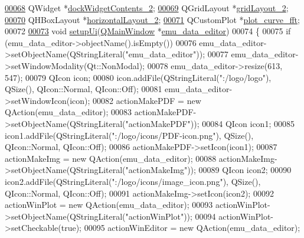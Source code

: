\begin{DoxyCode}
\hypertarget{a00051_source_l00068}{}\hyperlink{a00026_ae304b249d83cb3152fbbf7a7d7e0e29b}{00068}     QWidget *\hyperlink{a00026_ae304b249d83cb3152fbbf7a7d7e0e29b}{dockWidgetContents\_2};
\hypertarget{a00051_source_l00069}{}\hyperlink{a00026_ab6610272c6c39cba66cab113d98dcdcd}{00069}     QGridLayout *\hyperlink{a00026_ab6610272c6c39cba66cab113d98dcdcd}{gridLayout\_2};
\hypertarget{a00051_source_l00070}{}\hyperlink{a00026_aaee23fa38e3335cc652ebd35fcdbafc8}{00070}     QHBoxLayout *\hyperlink{a00026_aaee23fa38e3335cc652ebd35fcdbafc8}{horizontalLayout\_2};
\hypertarget{a00051_source_l00071}{}\hyperlink{a00026_a2bdf46ca3b702151408e6f6bd96b3228}{00071}     QCustomPlot *\hyperlink{a00026_a2bdf46ca3b702151408e6f6bd96b3228}{plot\_curve\_fft};
00072 
\hypertarget{a00051_source_l00073}{}\hyperlink{a00026_a33af8ac054888d9cc0833b699028b690}{00073}     \textcolor{keywordtype}{void} \hyperlink{a00026_a33af8ac054888d9cc0833b699028b690}{setupUi}(\hyperlink{a00010}{QMainWindow} *\hyperlink{a00004}{emu\_data\_editor})
00074     \{
00075         \textcolor{keywordflow}{if} (emu\_data\_editor->objectName().isEmpty())
00076             emu\_data\_editor->setObjectName(QStringLiteral(\textcolor{stringliteral}{"emu\_data\_editor"}));
00077         emu\_data\_editor->setWindowModality(Qt::NonModal);
00078         emu\_data\_editor->resize(613, 547);
00079         QIcon icon;
00080         icon.addFile(QStringLiteral(\textcolor{stringliteral}{":/logo/logo"}), QSize(), QIcon::Normal, QIcon::Off);
00081         emu\_data\_editor->setWindowIcon(icon);
00082         actionMakePDF = \textcolor{keyword}{new} QAction(emu\_data\_editor);
00083         actionMakePDF->setObjectName(QStringLiteral(\textcolor{stringliteral}{"actionMakePDF"}));
00084         QIcon icon1;
00085         icon1.addFile(QStringLiteral(\textcolor{stringliteral}{":/logo/icons/PDF-icon.png"}), QSize(), QIcon::Normal, QIcon::Off);
00086         actionMakePDF->setIcon(icon1);
00087         actionMakeImg = \textcolor{keyword}{new} QAction(emu\_data\_editor);
00088         actionMakeImg->setObjectName(QStringLiteral(\textcolor{stringliteral}{"actionMakeImg"}));
00089         QIcon icon2;
00090         icon2.addFile(QStringLiteral(\textcolor{stringliteral}{":/logo/icons/image\_icon.png"}), QSize(), QIcon::Normal, QIcon::Off);
00091         actionMakeImg->setIcon(icon2);
00092         actionWinPlot = \textcolor{keyword}{new} QAction(emu\_data\_editor);
00093         actionWinPlot->setObjectName(QStringLiteral(\textcolor{stringliteral}{"actionWinPlot"}));
00094         actionWinPlot->setCheckable(\textcolor{keyword}{true});
00095         actionWinEditor = \textcolor{keyword}{new} QAction(emu\_data\_editor);

\end{DoxyCode}
